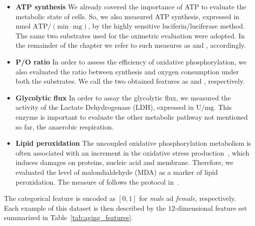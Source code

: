 \begin{itemize}
	\item[] \textbf{ATP synthesis} We already covered the importance of ATP to evaluate the metabolic state of cells. So, we also measured ATP synthesis, expressed in $\text{nmol~ATP}/(\text{min}\cdot\text{mg})$,  by the highly sensitive luciferin/luciferase method. The same two substrates used for the oximetric evaluation were adopted. In the remainder of the chapter we refer to such measures as \atppyrmal and \atpsucc, accordingly.
	
	\item[] \textbf{P/O ratio} In order to assess the efficiency of oxidative phosphorylation, we also evaluated the ratio between \ATP synthesis and oxygen consumption under both the substrates. We call the two obtained features as \popyrmal and \posucc, respectively.
	
	\item[] \textbf{Glycolytic flux} In order to assay the glycolytic flux, we measured the activity of the Lactate Dehydrogenase (\ac{LDH}), expressed in $\text{U}/\text{mg}$. This enzyme is important to evaluate the other metabolic pathway not mentioned so far, \ie the anaerobic respiration.
	
	\item[] \textbf{Lipid peroxidation} The uncoupled oxidative phosphorylation metabolism is often associated with an increment in the oxidative stress production~\cite{dai2014mitochondrial}, which induces damages on proteins, nucleic acid and membrane. Therefore, we evaluated the level of malondialdehyde (\ac{MDA}) as a marker of lipid peroxidation. The measure of \mda follows the protocol in~\cite{ravera2015oxidative}.
\end{itemize}

The categorical feature \gender is encoded as $[0,1]$ for \textit{male} ad \textit{female}, respectively.
Each example of this dataset is then described by the $12$-dimensional feature set summarized in Table~\ref{tab:aging_features}.

